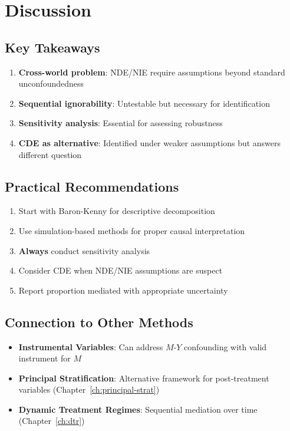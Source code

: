 \section{Discussion}

\subsection{Key Takeaways}

\begin{enumerate}
\item \textbf{Cross-world problem}: NDE/NIE require assumptions beyond standard unconfoundedness
\item \textbf{Sequential ignorability}: Untestable but necessary for identification
\item \textbf{Sensitivity analysis}: Essential for assessing robustness
\item \textbf{CDE as alternative}: Identified under weaker assumptions but answers different question
\end{enumerate}

\subsection{Practical Recommendations}

\begin{enumerate}
\item Start with Baron-Kenny for descriptive decomposition
\item Use simulation-based methods for proper causal interpretation
\item \textbf{Always} conduct sensitivity analysis
\item Consider CDE when NDE/NIE assumptions are suspect
\item Report proportion mediated with appropriate uncertainty
\end{enumerate}

\subsection{Connection to Other Methods}

\begin{itemize}
\item \textbf{Instrumental Variables}: Can address $M$-$Y$ confounding with valid instrument for $M$
\item \textbf{Principal Stratification}: Alternative framework for post-treatment variables (Chapter~\ref{ch:principal-strat})
\item \textbf{Dynamic Treatment Regimes}: Sequential mediation over time (Chapter~\ref{ch:dtr})
\end{itemize}
